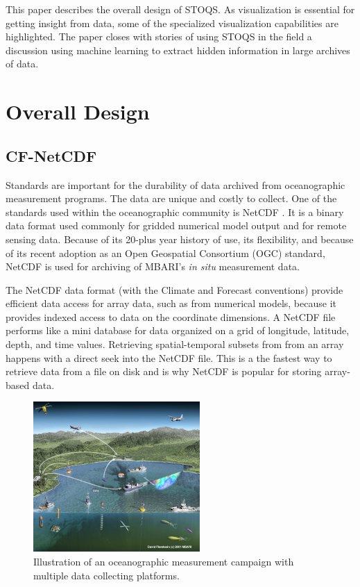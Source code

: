 \documentclass[conference]{IEEEtran}
\begin{document}
This paper describes the overall design of STOQS. As visualization is essential for getting insight from data, some of the specialized visualization capabilities are highlighted. The paper closes with stories of using STOQS in the field a discussion using machine learning to extract hidden information in large archives of data.

\section{Overall Design}

\subsection{CF-NetCDF}

Standards are important for the durability of data archived from oceanographic measurement programs. The data are unique and costly to collect. One of the standards used within the oceanographic community is NetCDF \cite{Rew1990}. It is a binary data format used commonly for gridded numerical model output and for remote sensing data. Because of its 20-plus year history of use, its flexibility, and because of its recent adoption as an Open Geospatial Consortium (OGC) standard, NetCDF is used for archiving of MBARI's \textit{in situ} measurement data.

The NetCDF data format (with the Climate and Forecast conventions) provide efficient data access for array data, such as from numerical models, because it provides indexed access to data on the coordinate dimensions. A NetCDF file performs like a mini database for data organized on a grid of longitude, latitude, depth, and time values. Retrieving spatial-temporal subsets from from an array happens with a direct seek into the NetCDF file. This is a the fastest way to retrieve data from a file on disk and is why NetCDF is popular for storing array-based data.

%
\begin{figure}[htbp]
\centering
\includegraphics[width=2.5in]{MUSE_illus_pp.jpg}
\caption{Illustration of an oceanographic measurement campaign with multiple data collecting platforms.}
\label{fig:MUSE_illus_pp}
\end{figure}
\end{document}

